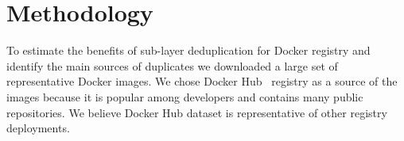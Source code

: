 \section{Methodology}
\label{sec:methodology}



%
%

To estimate the benefits of sub-layer deduplication for Docker registry and
identify the main sources of duplicates we downloaded a large set of
representative Docker images.
%
We chose Docker Hub~\cite{docker-hub} registry as a source of the images
because it is popular among developers and contains many public repositories.
%
We believe Docker Hub dataset is representative of other registry deployments.


